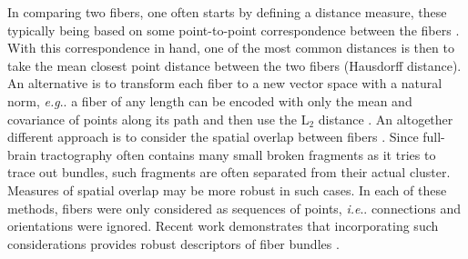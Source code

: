 \documentclass[final,hyperref]{gatech-thesis}
\makeatletter
\DeclareRobustCommand\onedot{\futurelet\@let@token\@onedot}
\def\@onedot{\ifx\@let@token.\else.\null\fi\xspace}
\newcommand{\ie}{\textit{i.e}\onedot}
\newcommand{\eg}{\textit{e.g}\onedot}
\makeatother
\begin{document}
In comparing two fibers, one often starts by defining a distance measure,
these typically being based on some point-to-point correspondence between the
fibers \cite{Ding2003,Corouge2006,ODonnell2007tmi}.  With this correspondence
in hand, one of the most common distances is then to take the mean closest
point distance between the two fibers (Hausdorff distance).
%
An alternative is to transform each fiber to a new vector space with a natural
norm, \eg a fiber of any length can be encoded with only the mean and
covariance of points along its path and then use the L$_2$ distance
\cite{Brun2004}.
%
An altogether different approach is to consider the spatial overlap between
fibers \cite{Wang2009,Wasserman2009}.  Since full-brain tractography often
contains many small broken fragments as it tries to trace out bundles, such
fragments are often separated from their actual cluster.  Measures of spatial
overlap may be more robust in such cases.
%
In each of these methods, fibers were only considered as sequences of points,
\ie connections and orientations were ignored.  Recent work demonstrates that
incorporating such considerations provides robust descriptors of fiber bundles
\cite{Durrelman2009}.
\end{document}
